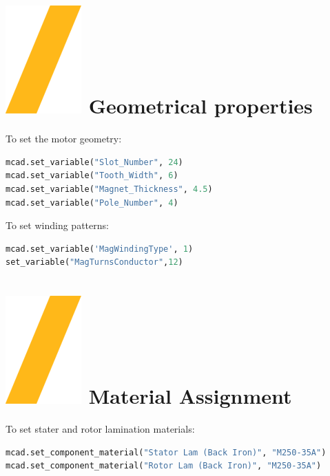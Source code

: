 \documentclass[landscape]{article}
\begin{document}
\begin{multicols}{3}
\section{\includegraphics[height=\fontcharht\font`\S]{slash.png} Geometrical properties}
To set the motor geometry:
\begin{lstlisting}[language=Python]
mcad.set_variable("Slot_Number", 24)
mcad.set_variable("Tooth_Width", 6)
mcad.set_variable("Magnet_Thickness", 4.5)
mcad.set_variable("Pole_Number", 4)
\end{lstlisting}
To set winding patterns:
\begin{lstlisting}[language=Python]
mcad.set_variable('MagWindingType', 1)
set_variable("MagTurnsConductor",12)
\end{lstlisting}

\section{\includegraphics[height=\fontcharht\font`\S]{slash.png} Material Assignment}
To set stater and rotor lamination materials:
\begin{lstlisting}[language=Python]
mcad.set_component_material("Stator Lam (Back Iron)", "M250-35A")
mcad.set_component_material("Rotor Lam (Back Iron)", "M250-35A")
\end{lstlisting}


\end{multicols}
\end{document}

